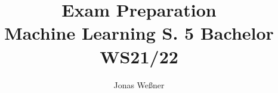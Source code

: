 \documentclass{article}
\begin{document}
\title{Exam Preparation\\Machine Learning S. 5 Bachelor WS21/22}
\author{Jonas Weßner}
\maketitle
\tableofcontents
\newpage				%


\end{document}
